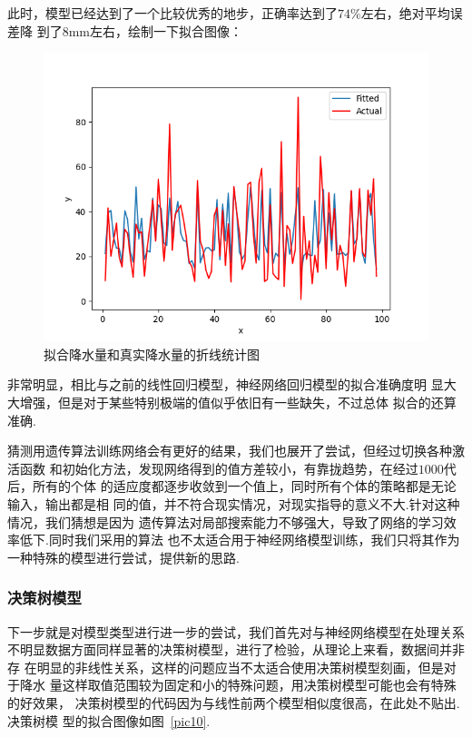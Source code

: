 \documentclass[UTF8, a4paper]{ctexart}
\begin{document}
此时，模型已经达到了一个比较优秀的地步，正确率达到了$74\%$左右，绝对平均误差降
到了$8$\si{\milli\meter}左右，绘制一下拟合图像：

\begin{figure}[h!]
	\centering
	\includegraphics[scale=0.3]{success.png}
	\caption{拟合降水量和真实降水量的折线统计图}
\end{figure}

非常明显，相比与之前的线性回归模型，神经网络回归模型的拟合准确度明
显大大增强，但是对于某些特别极端的值似乎依旧有一些缺失，不过总体
拟合的还算准确.

猜测用遗传算法训练网络会有更好的结果，我们也展开了尝试，但经过切换各种激活函数
和初始化方法，发现网络得到的值方差较小，有靠拢趋势，在经过$1000$代后，所有的个体
的适应度都逐步收敛到一个值上，同时所有个体的策略都是无论输入，输出都是相
同的值，并不符合现实情况，对现实指导的意义不大.针对这种情况，我们猜想是因为
遗传算法对局部搜索能力不够强大，导致了网络的学习效率低下.同时我们采用的算法
也不太适合用于神经网络模型训练，我们只将其作为一种特殊的模型进行尝试，提供新的思路.

\subsubsection{决策树模型}

下一步就是对模型类型进行进一步的尝试，我们首先对与神经网络模型在处理关系
不明显数据方面同样显著的决策树模型，进行了检验，从理论上来看，数据间并非存
在明显的非线性关系，这样的问题应当不太适合使用决策树模型刻画，但是对于降水
量这样取值范围较为固定和小的特殊问题，用决策树模型可能也会有特殊的好效果，
决策树模型的代码因为与线性前两个模型相似度很高，在此处不贴出.决策树模
型的拟合图像如图~\textcolor{red}{\ref{pic10}}.
\end{document}

